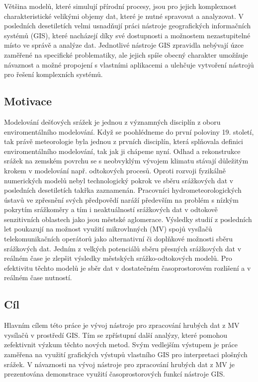 \documentclass[a4paper,12pt,oneside]{report}
\begin{document}
Většina modelů, které simulují přírodní procesy, jsou pro jejich komplexnost charakteristické velikými objemy dat, které je nutné spravovat a analyzovat. V posledních desetiletích velmi usnadňují práci nástroje geografických informačních systémů (GIS), které nacházejí díky své dostupnosti a možnostem nezastupitelné místo ve správě a analýze dat. Jednotlivé nástroje GIS zpravidla nebývají úzce zaměřené na specifické problematiky, ale jejich spíše obecný charakter umožňuje návaznost a možné propojení s vlastními aplikacemi a ulehčuje vytvoření nástrojů pro řešení komplexních systémů.

\subsection*{Motivace}
Modelování dešťových srážek je jednou z významných disciplín z oboru enviromentálního modelování. Když se poohlédneme do první poloviny 19. století, tak právě meteorologie byla jednou z prvních disciplín, která splňovala definici enviromentálního modelování, tak jak ji chápeme nyní. Odhad a rekonstrukce srážek na zemském povrchu se s neobvyklým vývojem klimatu  stávají důležitým krokem v modelování např. odtokových procesů. Oproti rozvoji fyzikálně numerických modelů nebyl technologický pokrok ve sběru srážkových dat v posledních desetiletích takřka zaznamenán. Pracovníci hydrometeorologických ústavů ve zpřesnění svých předpovědí naráží především na problém s nízkým pokrytím srážkoměry a tím i neaktuálností srážkových dat v odtokově senzitivních oblastech jako jsou městské aglomerace. Výsledky studií z posledních let poukazují na možnost využití mikrovlnných (MV) spojů vysílačů telekomunikačních operátorů jako alternativní či doplňkové možnosti sběru srážkových dat. Jedním z velkých  potenciálů sběru přesných srážkových dat v reálném čase je  zlepšit výsledky  městských srážko-odtokových modelů. Pro efektivitu těchto modelů je sběr dat v dostatečném časoprostorovém rozlišení a v reálném čase nutností.

\subsection*{Cíl}
Hlavním cílem této práce je vývoj nástroje pro zpracování hrubých dat z MV vysílačů v prostředí GIS. Tím se zpřístupní další analýzy, které pomohou zefektivnit výzkum těchto nových metod. Svým vedlejším výstupem je práce zaměřena na využití grafických výstupů vlastního GIS pro interpretaci plošných srážek. V návaznosti na vývoj nástroje pro zpracování hrubých dat z MV je prezentována demonstrace využití  časoprostorových funkcí nástroje GIS.
\end{document}
